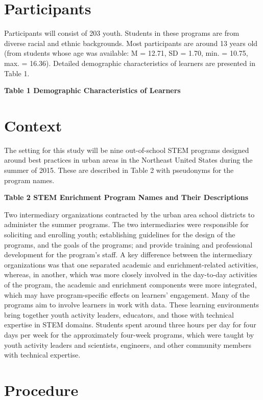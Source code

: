 \documentclass[]{book}
\theoremstyle{definition}
\theoremstyle{definition}
\theoremstyle{definition}
\theoremstyle{remark}
\begin{document}
\section{Participants}\label{participants}

Participants will consist of 203 youth. Students in these programs are
from diverse racial and ethnic backgrounds. Most participants are around
13 years old (from students whose age was available: M = 12.71, SD =
1.70, min. = 10.75, max. = 16.36). Detailed demographic characteristics
of learners are presented in Table 1.

\textbf{Table 1 Demographic Characteristics of Learners}

\section{Context}\label{context}

The setting for this study will be nine out-of-school STEM programs
designed around best practices in urban areas in the Northeast United
States during the summer of 2015. These are described in Table 2 with
pseudonyms for the program names.

\textbf{Table 2 STEM Enrichment Program Names and Their Descriptions}

Two intermediary organizations contracted by the urban area school
districts to administer the summer programs. The two intermediaries were
responsible for soliciting and enrolling youth; establishing guidelines
for the design of the programs, and the goals of the programs; and
provide training and professional development for the program's staff. A
key difference between the intermediary organizations was that one
separated academic and enrichment-related activities, whereas, in
another, which was more closely involved in the day-to-day activities of
the program, the academic and enrichment components were more
integrated, which may have program-specific effects on learners'
engagement. Many of the programs aim to involve learners in work with
data. These learning environments bring together youth activity leaders,
educators, and those with technical expertise in STEM domains. Students
spent around three hours per day for four days per week for the
approximately four-week programs, which were taught by youth activity
leaders and scientists, engineers, and other community members with
technical expertise.

\section{Procedure}\label{procedure}
\end{document}
